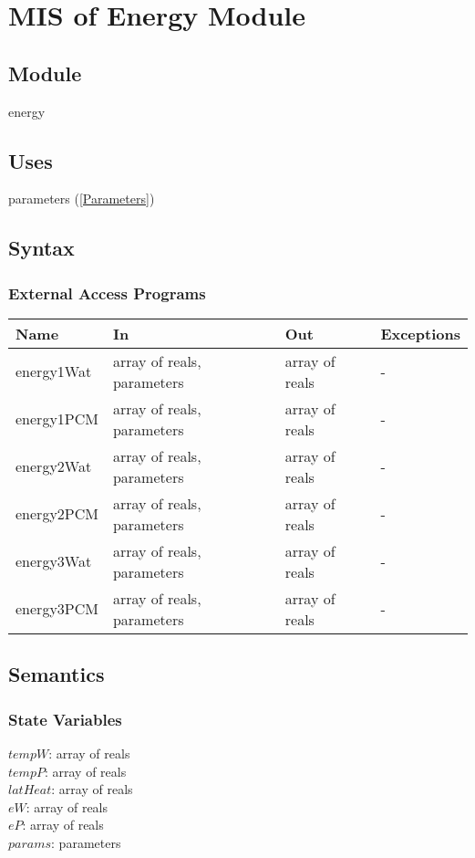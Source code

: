\documentclass[12pt]{article}
\begin{document}
\section{MIS of Energy Module} \label{Energy}
\subsection{Module}
energy
\subsection{Uses}
parameters (\ref{Parameters})
\subsection{Syntax}
\subsubsection{External Access Programs}
\begin{center}
\begin{tabular}{p{3cm} p{6cm} p{3cm} p{2cm}}
\hline
\textbf{Name} & \textbf{In} & \textbf{Out} & \textbf{Exceptions} \\
\hline
energy1Wat & array of reals, parameters & array of reals & - \\
\hline
energy1PCM & array of reals, parameters & array of reals & - \\
\hline
energy2Wat & array of reals, parameters & array of reals & - \\
\hline
energy2PCM & array of reals, parameters & array of reals & - \\
\hline
energy3Wat & array of reals, parameters & array of reals & - \\
\hline
energy3PCM & array of reals, parameters & array of reals & - \\
\hline
\end{tabular}
\end{center}
\subsection{Semantics}
\subsubsection{State Variables}
$tempW$: array of reals \\
$tempP$: array of reals \\
$latHeat$: array of reals \\
$eW$: array of reals \\
$eP$: array of reals \\
$params$: parameters 
\end{document}
